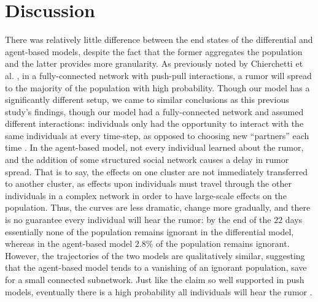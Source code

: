 \section{Discussion }
\label{sec:discussion}

There was relatively little difference between the end states of the differential and agent-based models, despite the fact that the former aggregates the population and the latter provides more granularity.
As previously noted by Chierchetti et al.
\cite{chierchetti-2010}, in a fully-connected network with push-pull interactions, a rumor will spread to the majority of the population with high probability.
Though our model has a significantly different setup, we came to similar conclusions as this previous study's findings, though our model had a fully-connected network and assumed different interactions: individuals only had the opportunity to interact with the same individuals at every time-step, as opposed to choosing new ``partners'' each time \cite{chierchetti-2010}.
In the agent-based model, not every individual learned about the rumor, and the addition of some structured social network causes a delay in rumor spread.
That is to say, the effects on one cluster are not immediately transferred to another cluster, as effects upon individuals must travel through the other individuals in a complex network in order to have large-scale effects on the population.
Thus, the curves are less dramatic, change more gradually, and there is no guarantee every individual will hear the rumor: by the end of the $ 22 $ days essentially none of the population remains ignorant in the differential model, whereas in the agent-based model $ 2.8\% $ of the population remains ignorant.
However, the trajectories of the two models are qualitatively similar, suggesting that the agent-based model tends to a vanishing of an ignorant population, save for a small connected subnetwork.
Just like the claim so well supported in push models, eventually there is a high probability all individuals will hear the rumor \cite{pittel-1987, angelopoulos-2009}.

